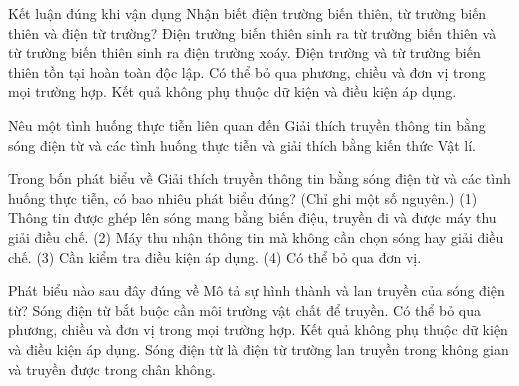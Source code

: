 \begin{ex}
Kết luận đúng khi vận dụng Nhận biết điện trường biến thiên, từ trường biến thiên và điện từ trường?
\choice
{\True Điện trường biến thiên sinh ra từ trường biến thiên và từ trường biến thiên sinh ra điện trường xoáy.}
{Điện trường và từ trường biến thiên tồn tại hoàn toàn độc lập.}
{Có thể bỏ qua phương, chiều và đơn vị trong mọi trường hợp.}
{Kết quả không phụ thuộc dữ kiện và điều kiện áp dụng.}
\end{ex}

\begin{bt}
Nêu một tình huống thực tiễn liên quan đến Giải thích truyền thông tin bằng sóng điện từ và các tình huống thực tiễn và giải thích bằng kiến thức Vật lí.
\end{bt}

\begin{ex}
Trong bốn phát biểu về Giải thích truyền thông tin bằng sóng điện từ và các tình huống thực tiễn, có bao nhiêu phát biểu đúng? (Chỉ ghi một số nguyên.) (1) Thông tin được ghép lên sóng mang bằng biến điệu, truyền đi và được máy thu giải điều chế. (2) Máy thu nhận thông tin mà không cần chọn sóng hay giải điều chế. (3) Cần kiểm tra điều kiện áp dụng. (4) Có thể bỏ qua đơn vị.
\end{ex}

\begin{ex}
Phát biểu nào sau đây đúng về Mô tả sự hình thành và lan truyền của sóng điện từ?
\choice
{Sóng điện từ bắt buộc cần môi trường vật chất để truyền.}
{Có thể bỏ qua phương, chiều và đơn vị trong mọi trường hợp.}
{Kết quả không phụ thuộc dữ kiện và điều kiện áp dụng.}
{\True Sóng điện từ là điện từ trường lan truyền trong không gian và truyền được trong chân không.}
\end{ex}

